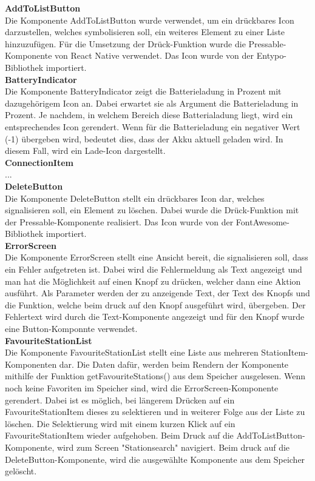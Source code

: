 \documentclass[]{article}
\begin{document}
\textbf{AddToListButton} \\
Die Komponente AddToListButton wurde verwendet, um ein drückbares Icon darzustellen, welches symbolisieren soll, ein weiteres Element zu einer Liste hinzuzufügen. Für die Umsetzung der Drück-Funktion wurde die Pressable-Komponente von React Native verwendet. Das Icon wurde von der Entypo-Bibliothek importiert. \newline \\
\textbf{BatteryIndicator} \\
Die Komponente BatteryIndicator zeigt die Batterieladung in Prozent mit dazugehörigem Icon an. Dabei erwartet sie als Argument die Batterieladung in Prozent. Je nachdem, in welchem Bereich diese Batterialadung liegt, wird ein entsprechendes Icon gerendert. Wenn für die Batterieladung ein negativer Wert (-1) übergeben wird, bedeutet dies, dass der Akku aktuell geladen wird. In diesem Fall, wird ein Lade-Icon dargestellt. \newline \\
\textbf{ConnectionItem} \\
... \newline \\
\textbf{DeleteButton} \\
Die Komponente DeleteButton stellt ein drückbares Icon dar, welches signalisieren soll, ein Element zu löschen. Dabei wurde die Drück-Funktion mit der Pressable-Komponente realisiert. Das Icon wurde von der FontAwesome-Bibliothek importiert. \newline \\
\textbf{ErrorScreen} \\
Die Komponente ErrorScreen stellt eine Ansicht bereit, die signalisieren soll, dass ein Fehler aufgetreten ist. Dabei wird die Fehlermeldung als Text angezeigt und man hat die Möglichkeit auf einen Knopf zu drücken, welcher dann eine Aktion ausführt. Als Parameter werden der zu anzeigende Text, der Text des Knopfs und die Funktion, welche beim druck auf den Knopf ausgeführt wird, übergeben. Der Fehlertext wird durch die Text-Komponente angezeigt und für den Knopf wurde eine Button-Komponnte verwendet. \newline \\
\textbf{FavouriteStationList} \\
Die Komponente FavouriteStationList stellt eine Liste aus mehreren StationItem-Komponenten dar. Die Daten dafür, werden beim Rendern der Komponente mithilfe der Funktion getFavouriteStations() aus dem Speicher ausgelesen. Wenn noch keine Favoriten im Speicher sind, wird die ErrorScreen-Komponente gerendert. Dabei ist es möglich, bei längerem Drücken auf ein FavouriteStationItem dieses zu selektieren und in weiterer Folge aus der Liste zu löschen. Die Selektierung wird mit einem kurzen Klick auf ein FavouriteStationItem wieder aufgehoben. Beim Druck auf die AddToListButton-Komponente, wird zum Screen "Stationsearch" navigiert. Beim druck auf die DeleteButton-Komponente, wird die ausgewählte Komponente aus dem Speicher gelöscht. \newline \\
\end{document}
